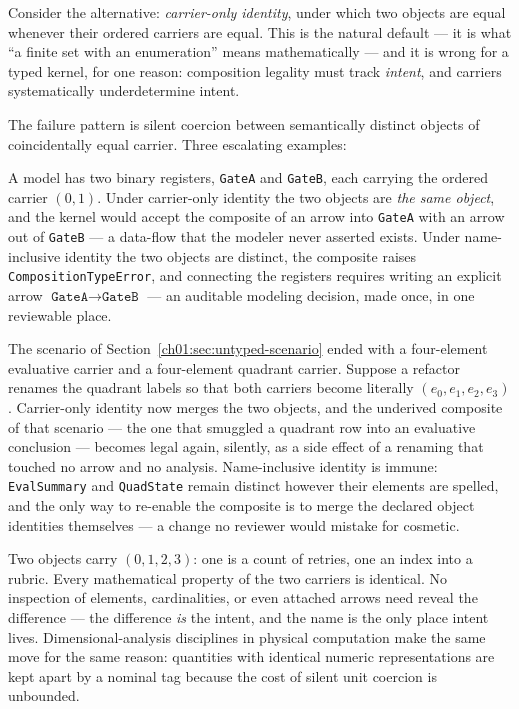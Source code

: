 Consider the alternative: \emph{carrier-only identity}, under which two
objects are equal whenever their ordered carriers are equal. This is the
natural default --- it is what ``a finite set with an enumeration'' means
mathematically --- and it is wrong for a typed kernel, for one reason:
composition legality must track \emph{intent}, and carriers systematically
underdetermine intent.

The failure pattern is silent coercion between semantically distinct objects
of coincidentally equal carrier. Three escalating examples:

\begin{example}\label{ch03:ex:two-registers}
A model has two binary registers, \texttt{GateA} and \texttt{GateB}, each
carrying the ordered carrier $(0, 1)$. Under carrier-only identity the two
objects are \emph{the same object}, and the kernel would accept the
composite of an arrow into \texttt{GateA} with an arrow out of
\texttt{GateB} --- a data-flow that the modeler never asserted exists.
Under name-inclusive identity the two objects are distinct, the composite
raises \texttt{CompositionTypeError}, and connecting the registers requires
writing an explicit arrow $\texttt{GateA} \to \texttt{GateB}$ --- an
auditable modeling decision, made once, in one reviewable place.
\end{example}

\begin{example}\label{ch03:ex:pipelines}
The scenario of Section~\ref{ch01:sec:untyped-scenario} ended with a
four-element evaluative carrier and a four-element quadrant carrier. Suppose
a refactor renames the quadrant labels so that both carriers become
literally $(e_0, e_1, e_2, e_3)$. Carrier-only identity now merges the two
objects, and the underived composite of that scenario --- the one that
smuggled a quadrant row into an evaluative conclusion --- becomes legal
again, silently, as a side effect of a renaming that touched no arrow and no
analysis. Name-inclusive identity is immune: \texttt{EvalSummary} and
\texttt{QuadState} remain distinct however their elements are spelled, and
the only way to re-enable the composite is to merge the declared object
identities themselves --- a change no reviewer would mistake for cosmetic.
\end{example}

\begin{example}\label{ch03:ex:units}
Two objects carry $(0, 1, 2, 3)$: one is a count of retries, one an index
into a rubric. Every mathematical property of the two carriers is
identical. No inspection of elements, cardinalities, or even attached
arrows need reveal the difference --- the difference \emph{is} the intent,
and the name is the only place intent lives. Dimensional-analysis
disciplines in physical computation make the same move for the same reason:
quantities with identical numeric representations are kept apart by a
nominal tag because the cost of silent unit coercion is unbounded.
\end{example}

